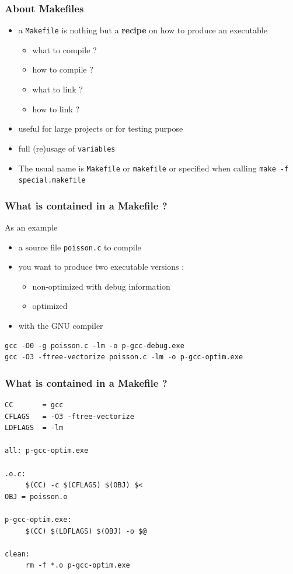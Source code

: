 \begin{frame}
\frametitle{About Makefiles}

\begin{itemize}
	\item a {\tt Makefile} is nothing but a {\bf recipe} on how to produce an executable
		\begin{itemize}
			\item what to compile ?
			\item how to compile ?
			\item what to link ?
			\item how to link ?
		\end{itemize}
	\item useful for large projects or for testing purpose
	\item full (re)usage of {\tt variables}
	\item The usual name is {\tt Makefile} or {\tt makefile} or specified when calling {\tt make -f special.makefile}
\end{itemize}
\end{frame}

\begin{frame}[containsverbatim]
\frametitle{What is contained in a Makefile ?}
As an example
\begin{itemize}
	\item a source file {\tt poisson.c} to compile
	\item you want to produce two executable versions : 
	\begin{itemize}
		\item non-optimized with debug information
		\item optimized 
	\end{itemize}
	\item with the GNU compiler
\end{itemize}

\begin{verbatim}
gcc -O0 -g poisson.c -lm -o p-gcc-debug.exe
gcc -O3 -ftree-vectorize poisson.c -lm -o p-gcc-optim.exe
\end{verbatim}
\end{frame}

\begin{frame}[containsverbatim]
\frametitle{What is contained in a Makefile ?}
\begin{verbatim}
CC       = gcc
CFLAGS   = -O3 -ftree-vectorize
LDFLAGS  = -lm

all: p-gcc-optim.exe

.o.c: 
     $(CC) -c $(CFLAGS) $(OBJ) $<
OBJ = poisson.o

p-gcc-optim.exe: 
     $(CC) $(LDFLAGS) $(OBJ) -o $@

clean:
     rm -f *.o p-gcc-optim.exe
\end{verbatim}
\end{frame}

